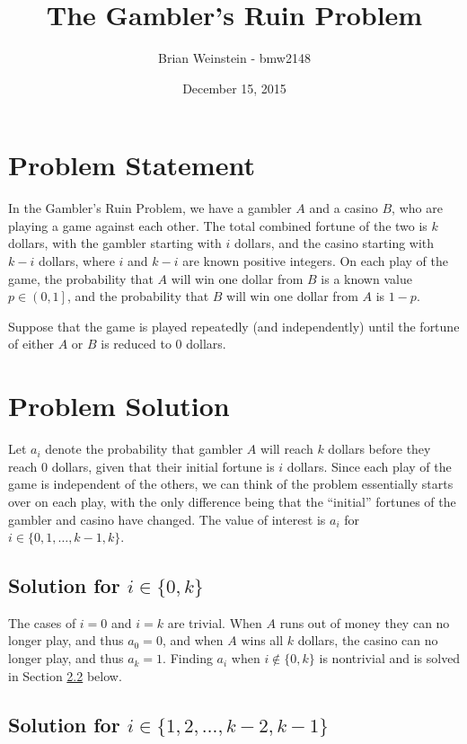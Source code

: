 \documentclass[a4paper,11pt]{article}
\title{The Gambler's Ruin Problem}
\author{Brian Weinstein - bmw2148}
\affil{Probability \& Statistics (STAT-W4700), Columbia University, Fall 2015}
\date{December 15, 2015}
\begin{document}
\maketitle
\doublespacing



\section{Problem Statement}

In the Gambler's Ruin Problem, we have a gambler $A$ and a casino $B$, who are playing a game against each other. The total combined fortune of the two is $k$ dollars, with the gambler starting with $i$ dollars, and the casino starting with $k-i$ dollars, where $i$ and $k-i$ are known positive integers. On each play of the game, the probability that $A$ will win one dollar from $B$ is a known value $p\in\left(0,1\right]$, and the probability that $B$ will win one dollar from $A$ is $1-p$.

Suppose that the game is played repeatedly (and independently) until the fortune of either $A$ or $B$ is reduced to 0 dollars.



\section{Problem Solution}
Let $a_i$ denote the probability that gambler $A$ will reach $k$ dollars before they reach 0 dollars, given that their initial fortune is $i$ dollars. Since each play of the game is independent of the others, we can think of the problem essentially starts over on each play, with the only difference being that the ``initial'' fortunes of the gambler and casino have changed. The value of interest is $a_i$ for $i\in\{0,1,\ldots,k-1,k\}$.

\subsection{Solution for $i \in \{0,k\}$}
\label{sec:solntrivial}

The cases of $i=0$ and $i=k$ are trivial. When $A$ runs out of money they can no longer play, and thus $a_0=0$, and when $A$ wins all $k$ dollars, the casino can no longer play, and thus $a_k=1$. Finding $a_i$ when $i\not\in\{0,k\}$ is nontrivial and is solved in Section \ref{sec:solnnontrivial} below.

\subsection{Solution for $i \in \{1,2,\ldots,k-2,k-1\}$}
\label{sec:solnnontrivial}
\end{document}
